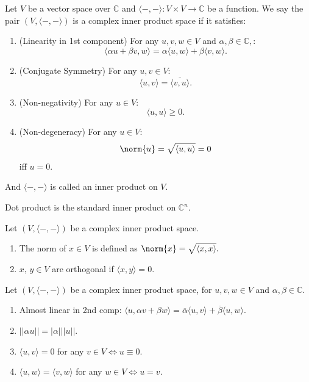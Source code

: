 \begin{definition}
    Let $V$ be a vector space over $\mathbb{C}$ and $\langle-,-\rangle: V\times V\to\mathbb{C}$ be a function.
    We say the pair $(V,\langle-,-\rangle)$ is a complex inner product space if it satisfies:
    \begin{enumerate}
        \item (Linearity in 1st component) For any $u,v,w\in V$ and $\alpha,\beta\in\mathbb{C},$:
        $$\langle\alpha u+\beta v,w\rangle = \alpha\langle u, w\rangle + \beta\langle v,w\rangle.$$
        \item (Conjugate Symmetry) For any $u,v\in V$:
        $$\langle u,v\rangle = \overline{\langle v,u\rangle}.$$
        \item (Non-negativity) For any $u\in V$:
        $$\langle u,u\rangle\ge 0.$$
        \item (Non-degeneracy) For any $u\in V$:
        $$\norm{u}=\sqrt{\langle u,u\rangle}=0$$ 
        iff $u=0$.
    \end{enumerate}
    And $\langle-,-\rangle$ is called an inner product on $V$.
\end{definition}

\begin{remark}
Dot product is the standard inner product on $\mathbb{C}^n.$
\end{remark}

\begin{definition}
    Let $(V,\langle-,-\rangle)$ be a complex inner product space.
    \begin{enumerate}
        \item The norm of $x\in V$ is defined as $\norm{x}=\sqrt{\langle x,x\rangle}.$
        \item $x,\,y\in V$ are orthogonal if $\langle x, y\rangle = 0.$
    \end{enumerate}
\end{definition}


\begin{theorem}
    Let $(V,\langle-,-\rangle)$ be a complex inner product space, for $u,v,w\in V$ and $\alpha,\beta\in\mathbb{C}$.
    \begin{enumerate}
        \item Almost linear in 2nd comp: $\langle u,\alpha v+\beta w\rangle=\overline{\alpha}\langle u,v\rangle+\overline{\beta}\langle u,w\rangle$.
        \item $||\alpha u||=|\alpha|||u||$.
        \item $\langle u,v\rangle=0$ for any $v\in V \Leftrightarrow u\equiv 0$.
        \item $\langle u,w\rangle=\langle v,w\rangle$ for any $w\in V \Leftrightarrow u=v$.
    \end{enumerate}
\end{theorem}

